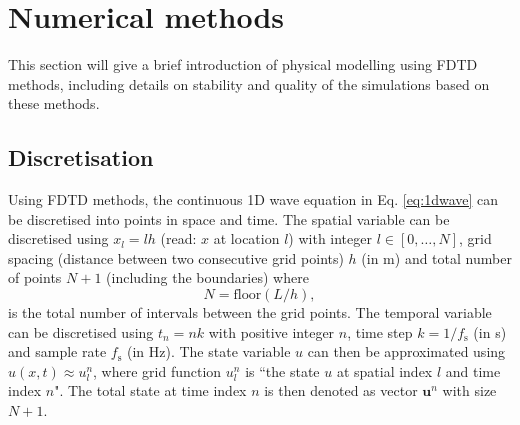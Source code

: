 \documentclass[dvipsnames, reprint]{JASA}
\begin{document}
\section{Numerical methods}\label{sec:FDTD}
This section will give a brief introduction of physical modelling using FDTD methods, including details on stability and quality of the simulations based on these methods.

\subsection{Discretisation}
Using FDTD methods, the continuous 1D wave equation in Eq. \eqref{eq:1dwave} can be discretised into points in space and time. The spatial variable can be discretised using $x_l = lh$ (read: $x$ at location $l$) with integer $l \in [0, \hdots, N]$, grid spacing (distance between two consecutive grid points) $h$ (in m) and total number of points $N + 1$ (including the boundaries) where
\begin{equation}\label{eq:numberOfPoints}
    N = \text{floor}(L/h),
\end{equation}
is the total number of intervals between the grid points. The temporal variable can be discretised using $t_n = nk$ with positive integer $n$, time step $k = 1/f_\text{s}$ (in s) and sample rate $f_\text{s}$ (in Hz). The state variable $u$ can then be approximated using $u(x,t) \approx u_l^n$, where grid function $u_l^n$ is ``the state $u$ at spatial index $l$ and time index $n$". The total state at time index $n$ is then denoted as vector $\mathbf{u}^n$ with size $N+1$.
\end{document}
